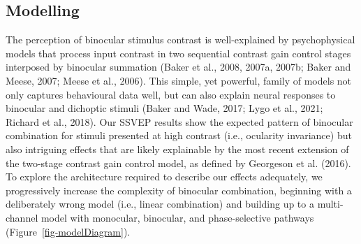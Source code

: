 \documentclass[
  12pt,
]{article}
\begin{document}
\subsection{Modelling}\label{modelling}

The perception of binocular stimulus contrast is well-explained by
psychophysical models that process input contrast in two sequential
contrast gain control stages interposed by binocular summation (Baker et
al., 2008, 2007a, 2007b; Baker and Meese, 2007; Meese et al., 2006).
This simple, yet powerful, family of models not only captures
behavioural data well, but can also explain neural responses to
binocular and dichoptic stimuli (Baker and Wade, 2017; Lygo et al.,
2021; Richard et al., 2018). Our SSVEP results show the expected pattern
of binocular combination for stimuli presented at high contrast (i.e.,
ocularity invariance) but also intriguing effects that are likely
explainable by the most recent extension of the two-stage contrast gain
control model, as defined by Georgeson et al. (2016). To explore the
architecture required to describe our effects adequately, we
progressively increase the complexity of binocular combination,
beginning with a deliberately wrong model (i.e., linear combination) and
building up to a multi-channel model with monocular, binocular, and
phase-selective pathways (Figure~\ref{fig-modelDiagram}).
\end{document}
